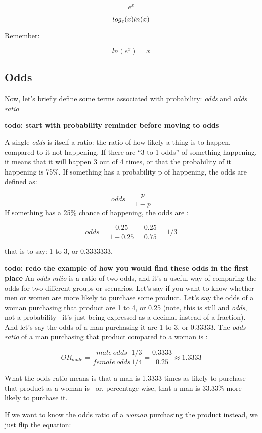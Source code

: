 \documentclass[]{article}
\begin{document}
\[ e^x \]

\[log_e(x) \\ ln(x)\]

Remember:

\[ ln(e^x) = x \]

\subsection{Odds}\label{odds}

Now, let's briefly define some terms associated with probability:
\emph{odds} and \emph{odds ratio}

\textbf{todo: start with probability reminder before moving to odds}

A single \emph{odds} is itself a ratio: the ratio of how likely a thing
is to happen, compared to it not happening. If there are ``3 to 1 odds''
of something happening, it means that it will happen 3 out of 4 times,
or that the probability of it happening is 75\%. If something has a
probability p of happening, the odds are defined as:

\[ odds = \frac{p}{1-p} \] If something has a 25\% chance of happening,
the odds are :

\[ odds = \frac{0.25}{1-0.25} = \frac{0.25}{0.75} = 1/3 \]

that is to say: 1 to 3, or 0.3333333.

\textbf{todo: redo the example of how you would find these odds in the
first place} An \emph{odds ratio} is a ratio of two odds, and it's a
useful way of comparing the odds for two different groups or scenarios.
Let's say if you want to know whether men or women are more likely to
purchase some product. Let's say the odds of a woman purchasing that
product are 1 to 4, or 0.25 (note, this is still and \emph{odds}, not a
probability-- it's just being expressed as a decimal instead of a
fraction). And let's say the odds of a man purchasing it are 1 to 3, or
0.33333. The \emph{odds ratio} of a man purchasing that product compared
to a woman is :

\[ OR_{male} = \frac{male \ odds}{female \ odds} \frac{1/3}{1/4} = \frac{0.3333}{0.25} \approx 1.3333 \]

What the odds ratio means is that a man is 1.3333 times as likely to
purchase that product as a woman is-- or, percentage-wise, that a man is
33.33\% more likely to purchase it.

If we want to know the odds ratio of a \emph{woman} purchasing the
product instead, we just flip the equation:
\end{document}
